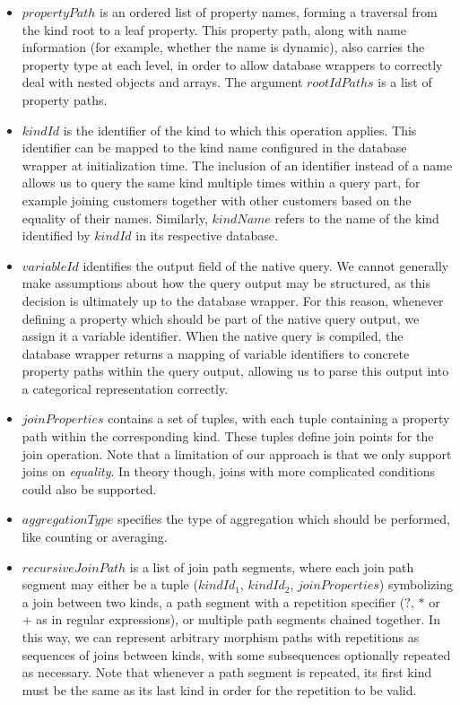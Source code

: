 \begin{itemize}
    \item $propertyPath$ is an ordered list of property names, forming a traversal from the kind root to a leaf property. This property path, along with name information (for example, whether the name is dynamic), also carries the property type at each level, in order to allow database wrappers to correctly deal with nested objects and arrays. The argument $rootIdPaths$ is a list of property paths.
    \item $kindId$ is the identifier of the kind to which this operation applies. This identifier can be mapped to the kind name configured in the database wrapper at initialization time. The inclusion of an identifier instead of a name allows us to query the same kind multiple times within a query part, for example joining customers together with other customers based on the equality of their names. Similarly, $kindName$ refers to the name of the kind identified by $kindId$ in its respective database.
    \item $variableId$ identifies the output field of the native query. We cannot generally make assumptions about how the query output may be structured, as this decision is ultimately up to the database wrapper. For this reason, whenever defining a property which should be part of the native query output, we assign it a variable identifier. When the native query is compiled, the database wrapper returns a mapping of variable identifiers to concrete property paths within the query output, allowing us to parse this output into a categorical representation correctly.
    \item $joinProperties$ contains a set of tuples, with each tuple containing a property path within the corresponding kind. These tuples define join points for the join operation. Note that a limitation of our approach is that we only support joins on \textit{equality}. In theory though, joins with more complicated conditions could also be supported. 
    \item $aggregationType$ specifies the type of aggregation which should be performed, like counting or averaging.
    \item $recursiveJoinPath$ is a list of join path segments, where each join path segment may either be a tuple ($kindId_1$, $kindId_2$, $joinProperties$) symbolizing a join between two kinds, a path segment with a repetition specifier ($?$, $*$ or $+$ as in regular expressions), or multiple path segments chained together. In this way, we can represent arbitrary morphism paths with repetitions as sequences of joins between kinds, with some subsequences optionally repeated as necessary. Note that whenever a path segment is repeated, its first kind must be the same as its last kind in order for the repetition to be valid.
\end{itemize}

